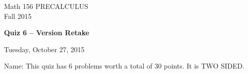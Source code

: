 \documentclass[11pt]{article}
\begin{document}
\begin{center}
\vspace{2in}

\huge{Math 156 PRECALCULUS \\
Fall 2015}

\vfill

\huge{\bf{Quiz 6 -- Version Retake}}\\

\vspace{0.5in}

\large{Tuesday, October 27, 2015}\\

\vfill


{\huge{Name:{\underline{\hspace{2in}}}}}
\vfill
This quiz has 6 problems worth a total of 30 points. It is TWO SIDED. 
\vfill
\end{center}
\newpage
\restoregeometry
\end{document}
